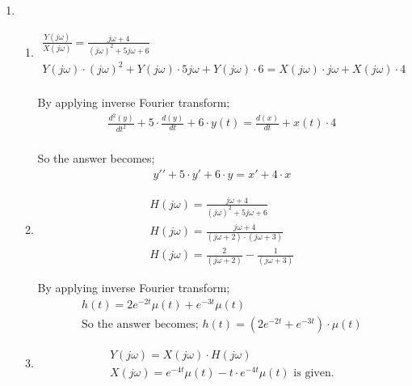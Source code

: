 \documentclass[10pt,a4paper, margin=1in]{article}
\begin{document}
\begin{enumerate}
\item %
    \begin{enumerate}
    \item %
    \begin{align*}
        \frac{Y(j\omega)}{X(j\omega)} = \frac{j\omega + 4}{ (j\omega)^2 + 5j\omega + 6} \\
        Y(j\omega) \cdot (j\omega)^2 + Y(j\omega) \cdot 5j\omega + Y(j\omega) \cdot 6 = X(j\omega) \cdot j\omega + X(j\omega) \cdot 4 
    \end{align*} \\
    
    By applying inverse Fourier transform;
    \begin{align*}
        \frac{d^2(y)}{dt^2} + 5 \cdot \frac{d(y)}{dt} + 6 \cdot y(t) = \frac{d(x)}{dt} + x(t) \cdot 4
    \end{align*} \\
    
    So the answer becomes;
    \begin{align*}
        y \prime \prime + 5 \cdot y\prime + 6 \cdot y = x\prime + 4\cdot x
    \end{align*}
    
    
    
    \item %
    \begin{align*}
        H(j\omega) = \frac{j\omega + 4}{ (j\omega)^2 + 5j\omega + 6} \\
        H(j\omega) = \frac{j\omega + 4}{(j\omega + 2) \cdot (j\omega + 3)} \\
        H(j\omega) = \frac{2}{(j\omega + 2)} - \frac{1}{(j\omega + 3)}
    \end{align*}
    
    By applying inverse Fourier transform;
    \begin{align*}
        h(t) = 2 e^{-2t} \mu(t) + e^{-3t} \mu(t) \\
        \text{So the answer becomes; } h(t) = (2 e^{-2t} + e^{-3t}) \cdot \mu(t) 
    \end{align*}
    
    
    
    \item %
    \begin{align*}
        Y(j\omega) = X(j\omega) \cdot H(j\omega) \\
        X(j\omega) = e^{-4t} \mu(t) - t \cdot e^{-4t} \mu(t) \text{ is given.}
    \end{align*}
    

\end{enumerate}
\end{enumerate}
\end{document}
